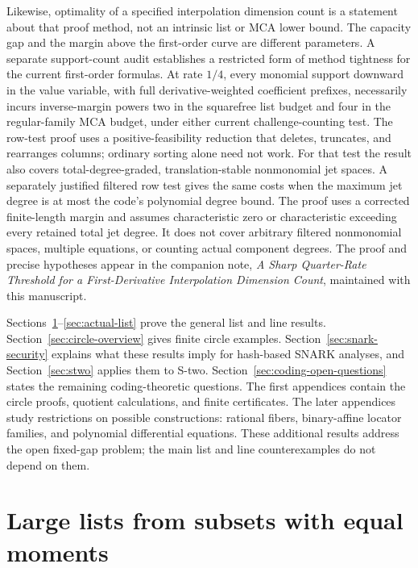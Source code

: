\documentclass[11pt,letterpaper]{article}
\theoremstyle{definition}
\theoremstyle{remark}
\begin{document}
Likewise, optimality of a specified interpolation dimension count is a
statement about that proof method, not an intrinsic list or MCA lower
bound. The capacity gap and the margin above the first-order curve are
different parameters.
A separate support-count audit establishes a restricted form of
method tightness for the current first-order formulas. At rate $1/4$,
every monomial support downward in the value variable, with full
derivative-weighted coefficient prefixes, necessarily incurs inverse-margin
powers two in the squarefree list budget and four in the regular-family
MCA budget, under either current challenge-counting test.
The row-test proof uses a positive-feasibility reduction that deletes,
truncates, and rearranges columns; ordinary sorting alone need not work.
For that test the result also covers total-degree-graded,
translation-stable nonmonomial jet spaces. A separately justified filtered
row test gives the same costs when the maximum jet degree is at most
the code's polynomial degree bound.
The proof uses a corrected finite-length margin and assumes characteristic
zero or characteristic exceeding every retained total jet degree.
It does not cover arbitrary filtered nonmonomial spaces,
multiple equations, or counting actual component degrees.
The proof and precise hypotheses appear in the companion note,
\emph{A Sharp Quarter-Rate Threshold for a First-Derivative
Interpolation Dimension Count}, maintained with this manuscript.


Sections~\ref{sec:lists}--\ref{sec:actual-list} prove the general list
and line results. Section~\ref{sec:circle-overview} gives finite circle
examples. Section~\ref{sec:snark-security} explains what these results
imply for hash-based SNARK analyses, and Section~\ref{sec:stwo}
applies them to S-two. Section~\ref{sec:coding-open-questions} states
the remaining coding-theoretic questions. The first appendices contain
the circle proofs, quotient calculations, and finite certificates.
The later appendices study restrictions on possible constructions:
rational fibers, binary-affine locator families, and polynomial
differential equations. These additional results address the open
fixed-gap problem; the main list and line counterexamples do not
depend on them.

\section{Large lists from subsets with equal moments}
\label{sec:lists}\label{im:section}
\end{document}
